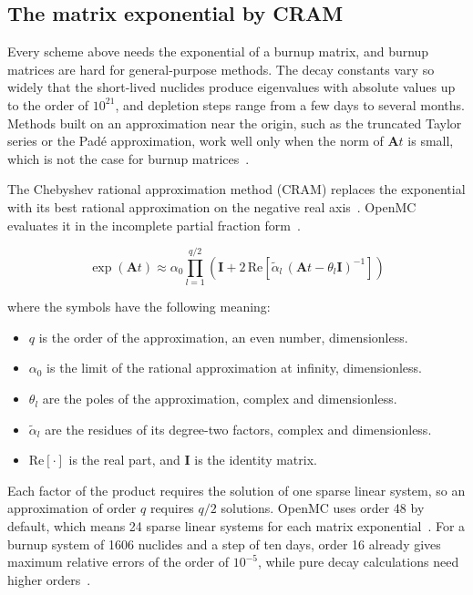 \subsection{The matrix exponential by CRAM}
\label{sec:bg-dep-cram}

Every scheme above needs the exponential of a burnup matrix, and burnup
matrices are hard for general-purpose methods. The decay constants vary
so widely that the short-lived nuclides produce eigenvalues with
absolute values up to the order of $10^{21}$, and depletion steps range
from a few days to several months. Methods built on an approximation
near the origin, such as the truncated Taylor series or the Pad\'e
approximation, work well only when the norm of $\mathbf{A}t$ is small,
which is not the case for burnup matrices~\cite{pusa_2016}.

The Chebyshev rational approximation method (CRAM) replaces the
exponential with its best rational approximation on the negative real
axis~\cite{pusa_2016}. OpenMC evaluates it in the incomplete partial
fraction form~\cite{romano_2021_depletion}.

\begin{equation}
\exp(\mathbf{A}t) \approx \alpha_0 \prod_{l=1}^{q/2}
\left(\mathbf{I} + 2\,\mathrm{Re}\!\left[\tilde{\alpha}_l\,
(\mathbf{A}t - \theta_l\mathbf{I})^{-1}\right]\right)
\label{eq:cram}
\end{equation}

\noindent where the symbols have the following meaning:

\begin{itemize}
  \item $q$ is the order of the approximation, an even number,
        dimensionless.

  \item $\alpha_0$ is the limit of the rational approximation at
        infinity, dimensionless.

  \item $\theta_l$ are the poles of the approximation, complex and
        dimensionless.

  \item $\tilde{\alpha}_l$ are the residues of its degree-two factors,
        complex and dimensionless.

  \item $\mathrm{Re}[\cdot]$ is the real part, and $\mathbf{I}$ is the
        identity matrix.
\end{itemize}

Each factor of the product requires the solution of one sparse linear
system, so an approximation of order $q$ requires $q/2$ solutions.
OpenMC uses order 48 by default, which means 24 sparse linear systems for
each matrix exponential~\cite{romano_2021_depletion}. For a burnup system
of 1606 nuclides and a step of ten days, order 16 already gives maximum
relative errors of the order of $10^{-5}$, while pure decay calculations
need higher orders~\cite{pusa_2016}.

